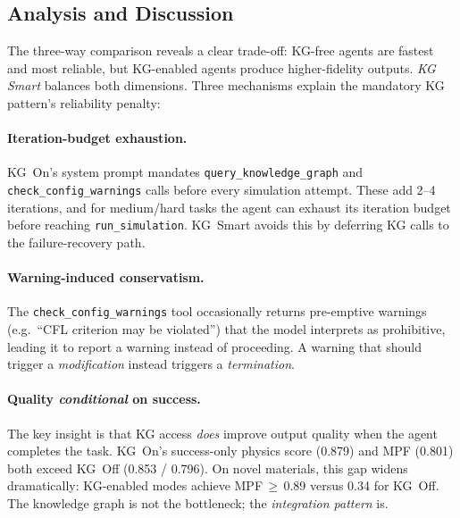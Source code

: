 \documentclass[twocolumn]{article}
\begin{document}
\subsection{Analysis and Discussion}
\label{sec:ablation-disc}

The three-way comparison reveals a clear trade-off: KG-free agents are
fastest and most reliable, but KG-enabled agents produce higher-fidelity
outputs.  \emph{KG Smart} balances both dimensions.  Three mechanisms
explain the mandatory KG pattern's reliability penalty:

\paragraph{Iteration-budget exhaustion.}
KG~On's system prompt mandates \texttt{query\_knowledge\_graph} and
\texttt{check\_config\_warnings} calls before every simulation attempt.
These add 2--4 iterations, and for medium/hard tasks the agent can
exhaust its iteration budget before reaching \texttt{run\_simulation}.
KG~Smart avoids this by deferring KG calls to the failure-recovery path.

\paragraph{Warning-induced conservatism.}
The \texttt{check\_config\_warnings} tool occasionally returns pre-emptive
warnings (e.g.\ ``CFL criterion may be violated'') that the model
interprets as prohibitive, leading it to report a warning instead of
proceeding.  A warning that should trigger a \emph{modification}
instead triggers a \emph{termination}.

\paragraph{Quality \emph{conditional} on success.}
The key insight is that KG access \emph{does} improve output quality
when the agent completes the task.  KG~On's success-only physics score
(0.879) and MPF (0.801) both exceed KG~Off (0.853 / 0.796).  On novel
materials, this gap widens dramatically: KG-enabled modes achieve
MPF\,$\geq$\,0.89 versus 0.34 for KG~Off.  The knowledge graph is not
the bottleneck; the \emph{integration pattern} is.
\end{document}
